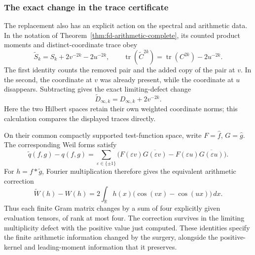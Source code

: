 \subsubsection*{The exact change in the trace certificate}

The replacement also has an explicit action on the spectral and
arithmetic data. In the notation of
Theorem~\ref{thm:fd-arithmetic-complete}, its counted product moments
and distinct-coordinate trace obey
\[
 \widetilde S_k=S_k+2v^{-2k}-2u^{-2k},\qquad
 \operatorname{tr}(\widetilde C^{2k})
     =\operatorname{tr}(C^{2k})-2u^{-2k}.
\]
The first identity counts the removed pair and the added copy of
the pair at \(v\). In the second, the coordinate at \(v\) was
already present, while the coordinate at \(u\) disappears.
Subtracting gives the exact limiting-defect change
\[
 \widetilde D_{\infty,k}=D_{\infty,k}+2v^{-2k}.
\]
Here the two Hilbert spaces retain their own weighted coordinate
norms; this calculation compares the displayed traces directly.

On their common compactly supported test-function space, write
\(F=\widehat f\), \(G=\widehat g\). The corresponding Weil forms
satisfy
\[
 \widetilde q(f,g)-q(f,g)
 =\sum_{\varepsilon\in\{\pm1\}}
   \bigl(F(\varepsilon v)\overline{G(\varepsilon v)}
        -F(\varepsilon u)\overline{G(\varepsilon u)}\bigr).
\]
For \(h=f*\widetilde g\), Fourier multiplication therefore gives
the equivalent arithmetic correction
\[
 \widetilde W(h)-W(h)
   =2\int_{\mathbb R}h(x)
                \bigl(\cos(vx)-\cos(ux)\bigr)\,dx.
\]
Thus each finite Gram matrix changes by a sum of four explicitly
given evaluation tensors, of rank at most four. The correction
survives in the limiting multiplicity defect with the positive
value just computed. These identities specify the finite arithmetic
information changed by the surgery, alongside the positive-kernel
and leading-moment information that it preserves.
